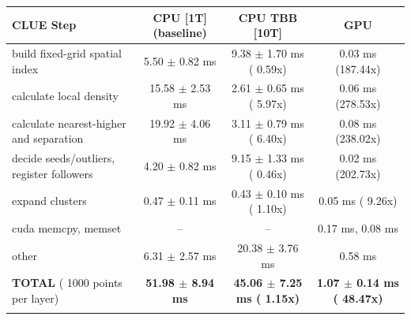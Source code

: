     \begin{tabular}{l|c|c|c}
    \hline
    CLUE Step                                 & CPU [1T] (baseline)         & CPU TBB [10T]                         & GPU                       \\ \hline
    build fixed-grid spatial index            &   5.50 $\pm$  0.82 ms       &   9.38 $\pm$  1.70 ms ( 0.59x)        &   0.03 ms (187.44x)       \\
    calculate local density                   &  15.58 $\pm$  2.53 ms       &   2.61 $\pm$  0.65 ms ( 5.97x)        &   0.06 ms (278.53x)       \\
    calculate nearest-higher and separation   &  19.92 $\pm$  4.06 ms       &   3.11 $\pm$  0.79 ms ( 6.40x)        &   0.08 ms (238.02x)       \\
    decide seeds/outliers, register followers &   4.20 $\pm$  0.82 ms       &   9.15 $\pm$  1.33 ms ( 0.46x)        &   0.02 ms (202.73x)       \\
    expand clusters                           &   0.47 $\pm$  0.11 ms       &   0.43 $\pm$  0.10 ms ( 1.10x)        &   0.05 ms (  9.26x)       \\ \hline
    cuda memcpy, memset                       & --                          & --                                    &   0.17 ms,   0.08 ms      \\
    other                                     &   6.31 $\pm$  2.57 ms       &  20.38 $\pm$  3.76 ms                 &   0.58 ms                 \\ \hline
    \textbf{TOTAL} ( 1000 points per layer)   & \textbf{ 51.98 $\pm$  8.94 ms} & \textbf{ 45.06 $\pm$  7.25 ms ( 1.15x)} & \textbf{  1.07 $\pm$  0.14 ms ( 48.47x)}  \\
    \hline
    \multicolumn{4}{c}{}
    \end{tabular}
    \linebreak


